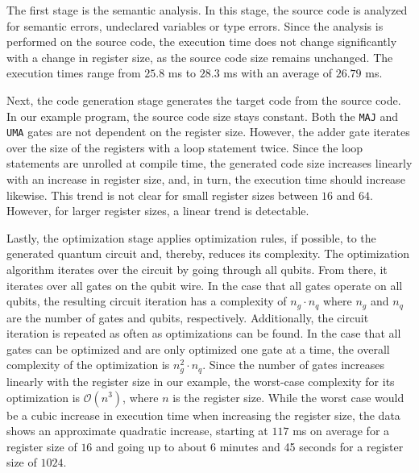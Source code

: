 The first stage is the semantic analysis. In this stage, the source code is analyzed for semantic errors, \eg undeclared variables or type errors. Since the analysis is performed on the source code, the execution time does not change significantly with a change in register size, as the source code size remains unchanged. The execution times range from $25.8$ ms to $28.3$ ms with an average of $26.79$ ms. 

Next, the code generation stage generates the target code from the source code. In our example program, the source code size stays constant. Both the \texttt{MAJ} and \texttt{UMA} gates are not dependent on the register size. However, the adder gate iterates over the size of the registers with a loop statement twice. Since the loop statements are unrolled at compile time, the generated code size increases linearly with an increase in register size, and, in turn, the execution time should increase likewise. This trend is not clear for small register sizes between $16$ and $64$. However, for larger register sizes, a linear trend is detectable.

Lastly, the optimization stage applies optimization rules, if possible, to the generated quantum circuit and, thereby, reduces its complexity. The optimization algorithm iterates over the circuit by going through all qubits. From there, it iterates over all gates on the qubit wire. In the case that all gates operate on all qubits, the resulting circuit iteration has a complexity of $n_g \cdot n_q$ where $n_g$ and $n_q$ are the number of gates and qubits, respectively. Additionally, the circuit iteration is repeated as often as optimizations can be found. In the case that all gates can be optimized and are only optimized one gate at a time, the overall complexity of the optimization is $n_g^2 \cdot n_q$. Since the number of gates increases linearly with the register size in our example, the worst-case complexity for its optimization is $\mathcal{O}(n^3)$, where $n$ is the register size. While the worst case would be a cubic increase in execution time when increasing the register size, the data shows an approximate quadratic increase, starting at $117$ ms on average for a register size of $16$ and going up to about $6$ minutes and 45 seconds for a register size of $1024$.

